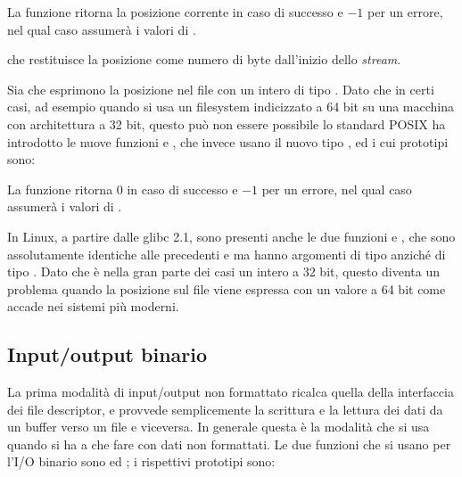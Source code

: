 \begin{funcproto}{
}

{La funzione ritorna la posizione corrente in caso di successo e $-1$ per un
  errore, nel qual caso  assumerà  i valori di .}  
\end{funcproto}

\noindent che restituisce la posizione come numero di byte dall'inizio dello
\textit{stream}.

Sia  che  esprimono la posizione nel file con un
intero di tipo . Dato che in certi casi, ad esempio quando si usa
un filesystem indicizzato a 64 bit su una macchina con architettura a 32 bit,
questo può non essere possibile lo standard POSIX ha introdotto le nuove
funzioni  e , che invece usano il nuovo tipo
, ed i cui prototipi sono:

\begin{funcproto}{
}

{La funzione ritorna $0$ in caso di successo e $-1$ per un errore, nel qual
  caso  assumerà i valori di .}
\end{funcproto}

In Linux, a partire dalle glibc 2.1, sono presenti anche le due funzioni
 e , che sono assolutamente identiche alle
precedenti  e  ma hanno argomenti di tipo
 anziché di tipo . Dato che  è nella
gran parte dei casi un intero a 32 bit, questo diventa un problema quando la
posizione sul file viene espressa con un valore a 64 bit come accade nei
sistemi più moderni.



\subsection{Input/output binario}
\label{sec:file_binary_io}

La prima modalità di input/output non formattato ricalca quella della
interfaccia dei file descriptor, e provvede semplicemente la scrittura e la
lettura dei dati da un buffer verso un file e viceversa. In generale questa è
la modalità che si usa quando si ha a che fare con dati non formattati. Le due
funzioni che si usano per l'I/O binario sono  ed ;
i rispettivi prototipi sono:

